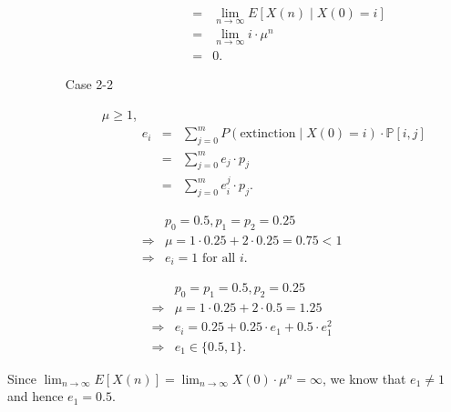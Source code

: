 \begin{question}
\begin{description}
\begin{itemize}
\begin{description}
\begin{eqnarray*}
                & = & \lim_{n \to \infty} E[X(n) \mid X(0) = i] \\
                & = & \lim_{n \to \infty} i \cdot \mu^{n} \\
                & = & 0.
            \end{eqnarray*}
          \item[Case 2-2] $ \mu \ge 1 $,
            \begin{eqnarray*}
              e_{i}
                & = & \sum_{j = 0}^{m} P(\text{extinction} \mid X(0) = i) \cdot \mathbb{P}[i, j] \\
                & = & \sum_{j = 0}^{m} e_{j} \cdot p_{j} \\
                & = & \sum_{j = 0}^{m} e_{i}^{j} \cdot p_{j}.
            \end{eqnarray*}
        \end{description}
    \end{itemize}
\end{description}
\end{question}

\begin{example}
\begin{eqnarray*}
  & & p_{0} = 0.5, p_{1} = p_{2} = 0.25 \\
  & \Rightarrow & \mu = 1 \cdot 0.25 + 2 \cdot 0.25 = 0.75 < 1 \\
  & \Rightarrow & e_{i} = 1 \text{ for all } i.
\end{eqnarray*}
\end{example}

\begin{example}
\begin{eqnarray*}
  & & p_{0} = p_{1} = 0.5, p_{2} = 0.25 \\
  & \Rightarrow & \mu = 1 \cdot 0.25 + 2 \cdot 0.5 = 1.25 \\
  & \Rightarrow & e_{i} = 0.25 + 0.25 \cdot e_{1} + 0.5 \cdot e_{1}^{2} \\
  & \Rightarrow & e_{1} \in \{ 0.5, 1 \}.
\end{eqnarray*}

Since $ \lim_{n \to \infty} E[X(n)] = \lim_{n \to \infty} X(0) \cdot \mu^{n} = \infty $, we know that $ e_{1} \neq 1 $ and hence $ e_{1} = 0.5 $.
\end{example}
